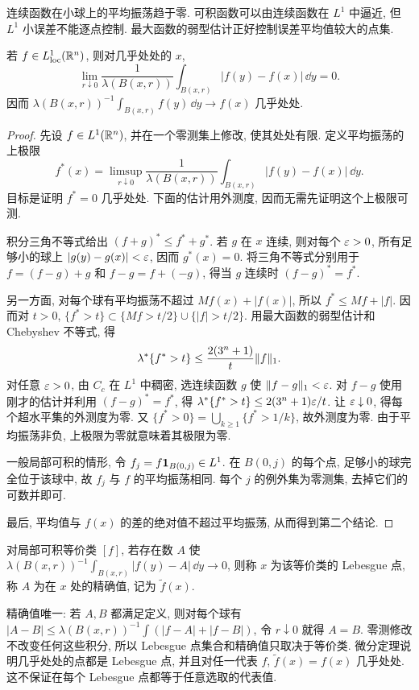 连续函数在小球上的平均振荡趋于零. 可积函数可以由连续函数在 $L^1$ 中逼近, 但 $L^1$ 小误差不能逐点控制. 最大函数的弱型估计正好控制误差平均值较大的点集.

\begin{theorem}\label{ra:c8:differentiation}
若 $f\in L^1_{\mathrm{loc}}(\mathbb R^n)$, 则对几乎处处的 $x$,
\[
 \lim_{r\downarrow0}\frac1{\lambda(B(x,r))}
 \int_{B(x,r)}|f(y)-f(x)|\,\dd y=0.
\]
因而 $\lambda(B(x,r))^{-1}\int_{B(x,r)}f(y)\,\dd y\to f(x)$ 几乎处处.
\end{theorem}
\begin{proof}
先设 $f\in L^1(\mathbb R^n)$, 并在一个零测集上修改, 使其处处有限. 定义平均振荡的上极限
\[
 f^*(x)=\limsup_{r\downarrow0}\frac1{\lambda(B(x,r))}
 \int_{B(x,r)}|f(y)-f(x)|\,\dd y.
\]
目标是证明 $f^*=0$ 几乎处处. 下面的估计用外测度, 因而无需先证明这个上极限可测.

积分三角不等式给出 $(f+g)^*\le f^*+g^*$. 若 $g$ 在 $x$ 连续, 则对每个 $\varepsilon>0$, 所有足够小的球上 $|g(y)-g(x)|<\varepsilon$, 因而 $g^*(x)=0$. 将三角不等式分别用于 $f=(f-g)+g$ 和 $f-g=f+(-g)$, 得当 $g$ 连续时 $(f-g)^*=f^*$.

另一方面, 对每个球有平均振荡不超过 $Mf(x)+|f(x)|$, 所以 $f^*\le Mf+|f|$. 因而对 $t>0$,
$\{f^*>t\}\subset\{Mf>t/2\}\cup\{|f|>t/2\}$.
用最大函数的弱型估计和 Chebyshev 不等式, 得
\[
 \lambda^*\{f^*>t\}\le\frac{2(3^n+1)}{t}\lVert f\rVert_1.
\]
对任意 $\varepsilon>0$, 由 $C_c$ 在 $L^1$ 中稠密, 选连续函数 $g$ 使 $\lVert f-g\rVert_1<\varepsilon$. 对 $f-g$ 使用刚才的估计并利用 $(f-g)^*=f^*$, 得
$\lambda^*\{f^*>t\}\le2(3^n+1)\varepsilon/t$.
让 $\varepsilon\downarrow0$, 得每个超水平集的外测度为零. 又
$\{f^*>0\}=\bigcup_{k\ge1}\{f^*>1/k\}$,
故外测度为零. 由于平均振荡非负, 上极限为零就意味着其极限为零.

一般局部可积的情形, 令 $f_j=f\mathbf 1_{B(0,j)}\in L^1$. 在 $B(0,j)$ 的每个点, 足够小的球完全位于该球中, 故 $f_j$ 与 $f$ 的平均振荡相同. 每个 $j$ 的例外集为零测集, 去掉它们的可数并即可.

最后, 平均值与 $f(x)$ 的差的绝对值不超过平均振荡, 从而得到第二个结论.
\end{proof}

\begin{definition}\label{ra:c8:lebpoint}
对局部可积等价类 $[f]$, 若存在数 $A$ 使
$\lambda(B(x,r))^{-1}\int_{B(x,r)}|f(y)-A|\,\dd y\to0$,
则称 $x$ 为该等价类的 Lebesgue 点, 称 $A$ 为在 $x$ 处的精确值, 记为 $\widetilde f(x)$.
\end{definition}

精确值唯一: 若 $A,B$ 都满足定义, 则对每个球有
$|A-B|\le\lambda(B(x,r))^{-1}\int(|f-A|+|f-B|)$,
令 $r\downarrow0$ 就得 $A=B$. 零测修改不改变任何这些积分, 所以 Lebesgue 点集合和精确值只取决于等价类. 微分定理说明几乎处处的点都是 Lebesgue 点, 并且对任一代表 $f$, $\widetilde f(x)=f(x)$ 几乎处处. 这不保证在每个 Lebesgue 点都等于任意选取的代表值.

